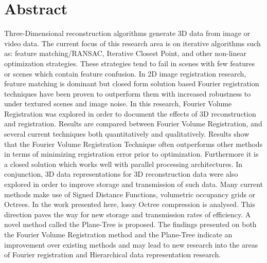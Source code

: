 \makeatletter
\chapter{Abstract}

Three-Dimensional reconstruction algorithms generate 3D data from image or video data. The current focus of this research area is on iterative algorithms such as: feature matching/RANSAC, Iterative Closest Point, and other non-linear optimization strategies. These strategies tend to fail in scenes with few features or scenes which contain feature confusion. In 2D image registration research, feature matching is dominant but closed form solution based Fourier registration techniques have been proven to outperform them with increased robustness to under textured scenes and image noise. In this research, Fourier Volume Registration was explored in order to document the effects of 3D reconstruction and registration. Results are compared between Fourier Volume Registration, and several current techniques both quantitatively and qualitatively. Results show that the Fourier Volume Registration Technique often outperforms other methods in terms of minimizing registration error prior to optimization. Furthermore it is a closed solution which works well with parallel processing architectures. In conjunction, 3D data representations for 3D reconstruction data were also explored in order to improve storage and transmission of such data. Many current methods make use of Signed Distance Functions, volumetric occupancy grids or Octrees. In the work presented here, lossy Octree compression is analysed. This direction paves the way for new storage and transmission rates of efficiency. A novel method called the Plane-Tree is proposed. The findings presented on both the Fourier Volume Registration method and the Plane-Tree indicate an improvement over existing methods and may lead to new research into the areas of Fourier registration and Hierarchical data representation research.


